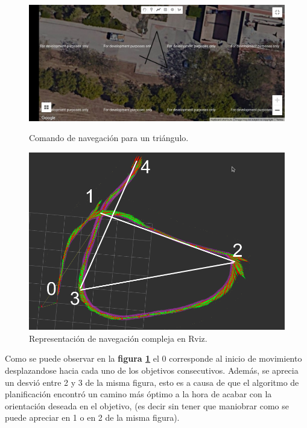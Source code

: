 \begin{figure}[htbp]
  \centering
  \begin{minipage}[b]{0.45\textwidth}
    \centering
    \includegraphics[width=\textwidth]{images/triangulo_navegacion_captura.jpeg}
    \caption{Comando de navegación para un triángulo.}
    \label{fig:navegacion_cuadrado_web}
  \end{minipage}
  \hfill
  \begin{minipage}[b]{0.5\textwidth}
    \centering
    \includegraphics[width=\textwidth]{images/triangulo_nav.png}
    \caption{Representación de navegación compleja en Rviz.}
    \label{fig:navegacion_cuadrado_rviz}
  \end{minipage}
\end{figure}

Como se puede observar en la \textbf{figura \ref{fig:navegacion_cuadrado_rviz}} el 0 corresponde al inicio de movimiento desplazandose hacia cada uno de los objetivos consecutivos. Además, se 
aprecia un desvió entre 2 y 3 de la misma figura, esto es a causa de que el algoritmo de planificación encontró un camino más óptimo a la hora de 
acabar con la orientación deseada en el objetivo, (es decir sin tener que maniobrar como se puede apreciar en 1 o en 2 de la misma figura).

